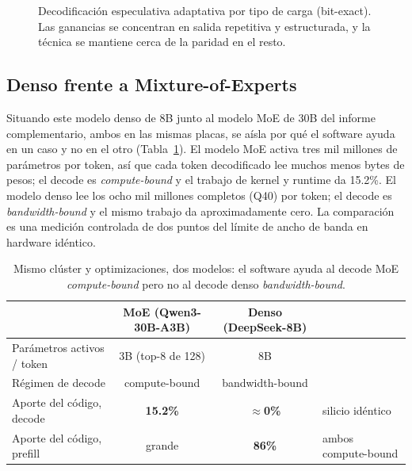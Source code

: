 \documentclass[10pt,a4paper]{article}
\begin{document}
\begin{figure}[H]
\centering
{}
\caption{Decodificación especulativa adaptativa por tipo de carga (bit-exact). Las ganancias se concentran en salida repetitiva y estructurada, y la técnica se mantiene cerca de la paridad en el resto.}
\label{fig:spec}
\end{figure}

\subsection{Denso frente a Mixture-of-Experts}
\label{sec:contrast}
Situando este modelo denso de 8B junto al modelo MoE de 30B del informe complementario, ambos en las mismas placas, se aísla por qué el software ayuda en un caso y no en el otro (Tabla~\ref{tab:contrast}). El modelo MoE activa tres mil millones de parámetros por token, así que cada token decodificado lee muchos menos bytes de pesos; el decode es \emph{compute-bound} y el trabajo de kernel y runtime da 15.2\%. El modelo denso lee los ocho mil millones completos (Q40) por token; el decode es \emph{bandwidth-bound} y el mismo trabajo da aproximadamente cero. La comparación es una medición controlada de dos puntos del límite de ancho de banda en hardware idéntico.

\begin{table}[H]
\centering\small
\caption{Mismo clúster y optimizaciones, dos modelos: el software ayuda al decode MoE \emph{compute-bound} pero no al decode denso \emph{bandwidth-bound}.}
\label{tab:contrast}
\begin{tabularx}{\textwidth}{p{4.8cm}cc X}
\toprule
 & \textbf{MoE (Qwen3-30B-A3B)} & \textbf{Denso (DeepSeek-8B)} & \\
\midrule
Parámetros activos / token & 3B (top-8 de 128) & 8B & \\
Régimen de decode & compute-bound & bandwidth-bound & \\
Aporte del código, decode & \textbf{15.2\%} & \textbf{$\approx$0\%} & silicio idéntico \\
Aporte del código, prefill & grande & \textbf{86\%} & ambos compute-bound \\
\bottomrule
\end{tabularx}
\end{table}
\end{document}
